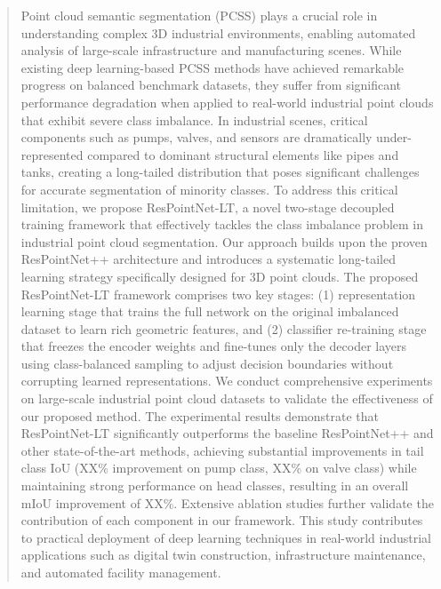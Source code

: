 \documentclass[preprint,12pt]{elsarticle}
\begin{document}
\begin{frontmatter}
\begin{abstract}
Point cloud semantic segmentation (PCSS) plays a crucial role in understanding complex 3D industrial environments, enabling automated analysis of large-scale infrastructure and manufacturing scenes. While existing deep learning-based PCSS methods have achieved remarkable progress on balanced benchmark datasets, they suffer from significant performance degradation when applied to real-world industrial point clouds that exhibit severe class imbalance. In industrial scenes, critical components such as pumps, valves, and sensors are dramatically under-represented compared to dominant structural elements like pipes and tanks, creating a long-tailed distribution that poses significant challenges for accurate segmentation of minority classes.
To address this critical limitation, we propose ResPointNet-LT, a novel two-stage decoupled training framework that effectively tackles the class imbalance problem in industrial point cloud segmentation. Our approach builds upon the proven ResPointNet++ architecture and introduces a systematic long-tailed learning strategy specifically designed for 3D point clouds. The proposed ResPointNet-LT framework comprises two key stages: (1) representation learning stage that trains the full network on the original imbalanced dataset to learn rich geometric features, and (2) classifier re-training stage that freezes the encoder weights and fine-tunes only the decoder layers using class-balanced sampling to adjust decision boundaries without corrupting learned representations.
We conduct comprehensive experiments on large-scale industrial point cloud datasets to validate the effectiveness of our proposed method. The experimental results demonstrate that ResPointNet-LT significantly outperforms the baseline ResPointNet++ and other state-of-the-art methods, achieving substantial improvements in tail class IoU (XX\% improvement on pump class, XX\% on valve class) while maintaining strong performance on head classes, resulting in an overall mIoU improvement of XX\%. Extensive ablation studies further validate the contribution of each component in our framework. This study contributes to practical deployment of deep learning techniques in real-world industrial applications such as digital twin construction, infrastructure maintenance, and automated facility management.
\end{abstract}


\end{frontmatter}
\end{document}

